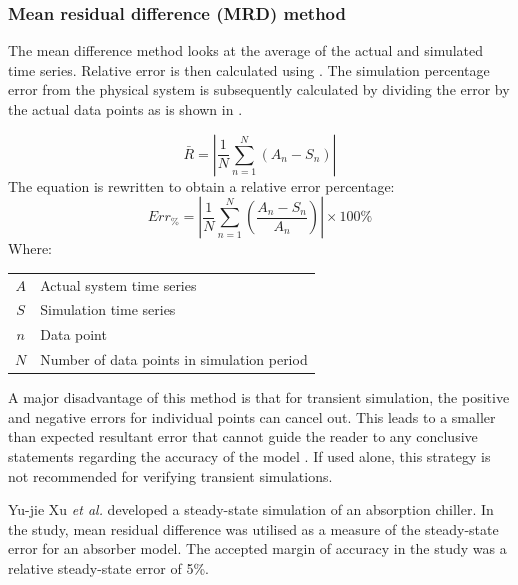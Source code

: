  		\subsubsection{Mean residual difference (MRD) method}
 			The mean difference method looks at the average of the actual and simulated time series. Relative error is then calculated using . The simulation percentage error from the physical system is subsequently calculated by dividing the error by the actual data points as is shown in .
 			
 			\begin{equation}
 			\label{eq: AMean absolute}
 			\bar{R} = \left| \dfrac{1}{N} \sum_{n=1}^{N}{ \left( A_{n} - S_{n}\right)} \right|
 			\end{equation}
The equation is rewritten to obtain a relative error percentage:	
 			\begin{equation}
 				\label{eq: Average difference}
 				Err_{\%} = \left| \dfrac{1}{N} \sum_{n=1}^{N}{ \left(\dfrac{ A_{n} - S_{n}}{A_n}\right)} \right| \times 100 \%
 			\end{equation}
 			Where: \par 
 				\begin{table}[!htbp]
 					\centering
 					\begin{tabular}{cl}
 						$A$ & Actual system time series \\
 						$S$ & Simulation time series \\
 						$n$ & Data point \\
 						$N$ & Number of data points in simulation period \\
 					\end{tabular} 
 				\end{table}	
 			\clearpage
 			A major disadvantage of this method is that for transient simulation, the positive and negative errors for individual points can cancel out. This leads to a smaller than expected resultant error that cannot guide the reader to any conclusive statements regarding the accuracy of the model \cite{sarin2010comparing}. If used alone, this strategy is not recommended for verifying transient simulations. 
 			\par 
 						
 			Yu-jie Xu \textit{et al.} \cite{xu2016modeling} developed a steady-state simulation of an absorption chiller. In the study, mean residual difference was utilised as a measure of the steady-state error for an absorber model. The accepted margin of accuracy in the study was a relative steady-state error of 5\%. 
 			
